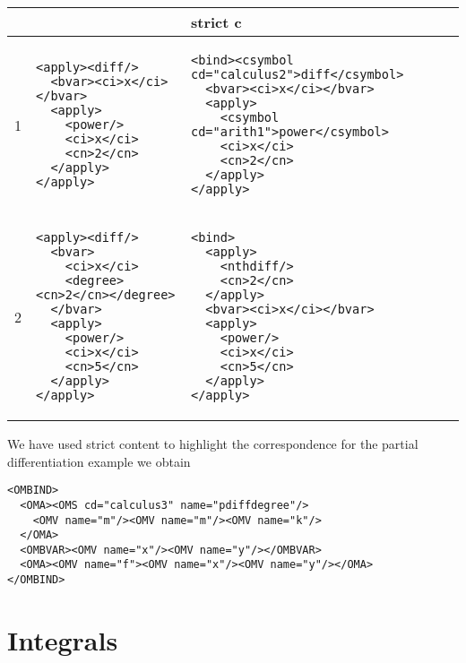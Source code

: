 \documentclass{llncs}
\begin{document}
\begin{center}\lstset{frame=none,numbers=none,lineskip=-.7ex,aboveskip=-.5em,belowskip=-1em,language=MathML2}
\begin{tabular}{|l|p{5.5cm}|p{8cm}|}\hline
 &  {\mathml2} & strict c{\mathml3}\\\hline
 1 &
\begin{lstlisting}
<apply><diff/>
  <bvar><ci>x</ci></bvar>
  <apply>
    <power/>
    <ci>x</ci>
    <cn>2</cn>
  </apply>
</apply>
\end{lstlisting}
&
\begin{lstlisting}
<bind><csymbol cd="calculus2">diff</csymbol>
  <bvar><ci>x</ci></bvar>
  <apply>
    <csymbol cd="arith1">power</csymbol>
    <ci>x</ci>
    <cn>2</cn>
  </apply>
</apply>
\end{lstlisting}
\\\hline
2 & 
\begin{lstlisting}[language=MathML2]
<apply><diff/>
  <bvar>
    <ci>x</ci>
    <degree><cn>2</cn></degree>
  </bvar>
  <apply>
    <power/>
    <ci>x</ci>
    <cn>5</cn>
  </apply>
</apply>
\end{lstlisting}
&
\begin{lstlisting}[language=MathML2]
<bind>
  <apply>
    <nthdiff/>
    <cn>2</cn>
  </apply>
  <bvar><ci>x</ci></bvar>
  <apply>
    <power/>
    <ci>x</ci>
    <cn>5</cn>
  </apply>
</apply>
\end{lstlisting}
\\\hline
\end{tabular}
\end{center}
We have used strict content {\mathml} to highlight the correspondence for the partial
differentiation example we obtain
\begin{lstlisting}[language=OpenMath]
<OMBIND>
  <OMA><OMS cd="calculus3" name="pdiffdegree"/>
    <OMV name="m"/><OMV name="m"/><OMV name="k"/>
  </OMA>
  <OMBVAR><OMV name="x"/><OMV name="y"/></OMBVAR>
  <OMA><OMV name="f"><OMV name="x"/><OMV name="y"/></OMA>
</OMBIND>
\end{lstlisting}

\section{Integrals}
\end{document}
